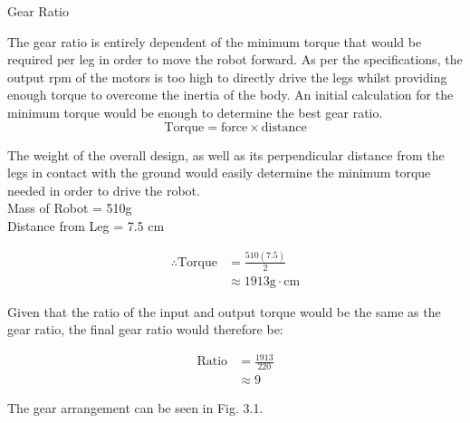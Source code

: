 \begin{homeworkProblem}
\begin{homeworkSection}{Gear Ratio}

The gear ratio is entirely dependent of the minimum torque that would be required per leg in order to move the robot forward. As per the specifications, the output rpm of the motors is too high to directly drive the legs whilst providing enough torque to overcome the inertia of the body. An initial calculation for the minimum torque would be enough to determine the best gear ratio.\\

\begin{equation}
  \text{Torque} = \text{force}\times\text{distance}
\end{equation}

The weight of the overall design, as well as its perpendicular distance from the legs in contact with the ground would easily determine the minimum torque needed in order to drive the robot. \\

Mass of Robot = 510g \\
Distance from Leg = 7.5 cm

\begin{equation*}
\begin{split}
  \therefore \text{Torque} &= \frac{510\left(7.5\right)}{2}\\
                           &\approx 1913 \text{g}\cdot\text{cm}
\end{split}
\end{equation*}

Given that the ratio of the input and output torque would be the same as the gear ratio, the final gear ratio would therefore be:

\begin{equation*}
\begin{split}
  \text{Ratio} &= \frac{1913}{220} \\
               &\approx 9
\end{split}
\end{equation*}

The gear arrangement can be seen in Fig. 3.1.

\end{homeworkSection}


\end{homeworkProblem}
